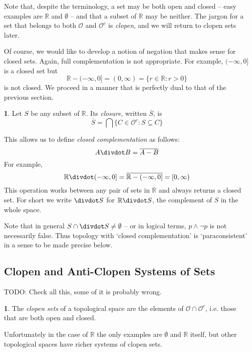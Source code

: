 \documentclass[oneside,english]{article}
\theoremstyle{plain}
\theoremstyle{definition}
\newtheorem{defn}[thm]{\protect\definitionname}
\theoremstyle{definition}
\providecommand{\definitionname}{Definition}
\begin{document}
Note that, despite the terminology, a set may be both open and closed -- easy examples are $\mathbb{R}$ and $\emptyset$ -- and that a subset of $\mathbb{R}$ may be neither. The jargon for a set that belongs to both $\mathscr{O}$ and $\mathscr{O}^c$ is \emph{clopen}, and we will return to clopen sets later.

Of course, we would like to develop a notion of negation that makes sense for closed sets. Again, full complementation is not appropriate. For example, $(-\infty, 0]$ is a closed set but
\[
	\mathbb{R}- (-\infty, 0] = (0, \infty) = \{r\in\mathbb{R}: r > 0\}
\]
is not closed. We proceed in a manner that is perfectly dual to that of the previous section.

\begin{defn}
	Let $S$ be any subset of $\mathbb{R}$. Its \emph{closure}, written $\overline{S}$, is 
	\[
	\overline{S} = \bigcap \{C\in \mathscr{O}^c : S\subseteq C\}
	\]
\end{defn}

This allows us to define \emph{closed complementation} as follows:
\[
	A\divdot B = \overline{A- B}
\]
For example,
\[
	\mathbb{R}\divdot (-\infty, 0] = \overline{\mathbb{R}- (-\infty, 0]} = [0, \infty)
\]
This operation works between any pair of sets in $\mathbb{R}$ and always returns a closed set. For short we write $\divdot S$ for $\mathbb{R}\divdot S$, the complement of $S$ in the whole space.

Note that in general $S\cap\divdot S\ne \emptyset$ -- or in logical terms, $p\land\lnot p$ is not necessarily false. Thus topology with `closed complementation' is `paraconsistent' in a sense to be made precise below.

\subsection{Clopen and Anti-Clopen Systems of Sets}

TODO: Check all this, some of it is probably wrong.

\begin{defn}
	The \emph{clopen sets} of a topological space are the elements of $\mathscr{O}\cap \mathscr{O}^c$, i.e. those that are both open and closed. 
\end{defn}
Unfortunately in the case of $\mathbb{R}$ the only examples are $\emptyset$ and $\mathbb{R}$ itself, but other topological spaces have richer systems of clopen sets.
\end{document}
